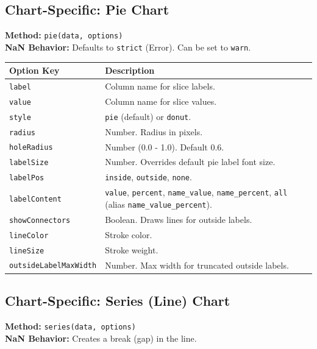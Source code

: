 \documentclass[10pt, a4paper]{article}
\begin{document}
\subsection{Chart-Specific: Pie Chart}
\textbf{Method:} \texttt{pie(data, options)} \\
\textbf{NaN Behavior:} Defaults to \texttt{strict} (Error). Can be set to \texttt{warn}.

\begin{longtable}{p{5cm} p{10cm}}
\toprule
\textbf{Option Key} & \textbf{Description} \\
\midrule
\texttt{label} & Column name for slice labels. \\
\texttt{value} & Column name for slice values. \\
\texttt{style} & \texttt{pie} (default) or \texttt{donut}. \\
\texttt{radius} & Number. Radius in pixels. \\
\texttt{holeRadius} & Number (0.0 - 1.0). Default 0.6. \\
\texttt{labelSize} & Number. Overrides default pie label font size. \\
\texttt{labelPos} & \texttt{inside}, \texttt{outside}, \texttt{none}. \\
\texttt{labelContent} & \texttt{value}, \texttt{percent}, \texttt{name\_value}, \texttt{name\_percent}, \texttt{all} (alias \texttt{name\_value\_percent}). \\
\texttt{showConnectors} & Boolean. Draws lines for outside labels. \\
\texttt{lineColor} & Stroke color. \\
\texttt{lineSize} & Stroke weight. \\
\texttt{outsideLabelMaxWidth} & Number. Max width for truncated outside labels. \\
\bottomrule
\end{longtable}

\subsection{Chart-Specific: Series (Line) Chart}
\textbf{Method:} \texttt{series(data, options)} \\
\textbf{NaN Behavior:} Creates a break (gap) in the line.
\end{document}
